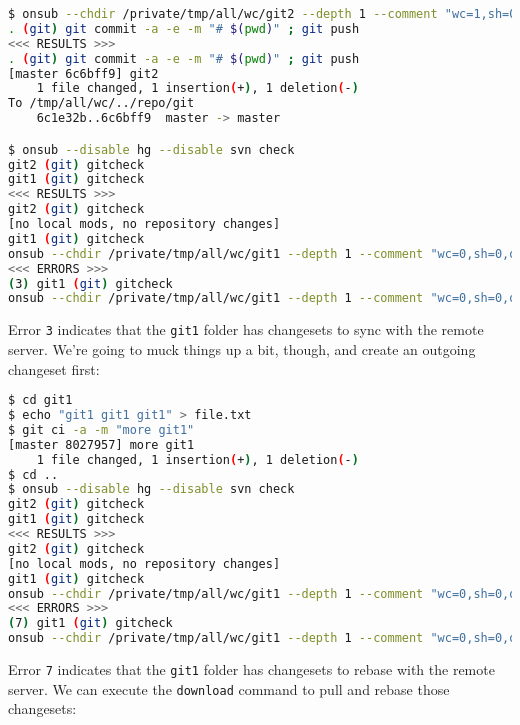 \begin{snugshade}
\begin{lstlisting}[language=bash]	
$ onsub --chdir /private/tmp/all/wc/git2 --depth 1 --comment "wc=1,sh=0,out=1,in=0" {put-upload}
. (git) git commit -a -e -m "# $(pwd)" ; git push
<<< RESULTS >>>
. (git) git commit -a -e -m "# $(pwd)" ; git push
[master 6c6bff9] git2
	1 file changed, 1 insertion(+), 1 deletion(-)
To /tmp/all/wc/../repo/git
	6c1e32b..6c6bff9  master -> master

$ onsub --disable hg --disable svn check
git2 (git) gitcheck
git1 (git) gitcheck
<<< RESULTS >>>
git2 (git) gitcheck
[no local mods, no repository changes]
git1 (git) gitcheck
onsub --chdir /private/tmp/all/wc/git1 --depth 1 --comment "wc=0,sh=0,out=0,in=2" {get}
<<< ERRORS >>>
(3) git1 (git) gitcheck
onsub --chdir /private/tmp/all/wc/git1 --depth 1 --comment "wc=0,sh=0,out=0,in=2" {get}
\end{lstlisting}
\end{snugshade}

Error \lstinline{3} indicates that the \lstinline{git1} folder has changesets to sync with the remote server. We're going to muck things up a bit, though, and create an outgoing changeset first:

\begin{snugshade}
\begin{lstlisting}[language=bash]	
$ cd git1
$ echo "git1 git1 git1" > file.txt
$ git ci -a -m "more git1"
[master 8027957] more git1
	1 file changed, 1 insertion(+), 1 deletion(-)
$ cd ..
$ onsub --disable hg --disable svn check
git2 (git) gitcheck
git1 (git) gitcheck
<<< RESULTS >>>
git2 (git) gitcheck
[no local mods, no repository changes]
git1 (git) gitcheck
onsub --chdir /private/tmp/all/wc/git1 --depth 1 --comment "wc=0,sh=0,out=1,in=2" {download}
<<< ERRORS >>>
(7) git1 (git) gitcheck
onsub --chdir /private/tmp/all/wc/git1 --depth 1 --comment "wc=0,sh=0,out=1,in=2" {download}
\end{lstlisting}
\end{snugshade}

Error \lstinline{7} indicates that the \lstinline{git1} folder has changesets to rebase with the remote server. We can execute the \lstinline{download} command to pull and rebase those changesets:

